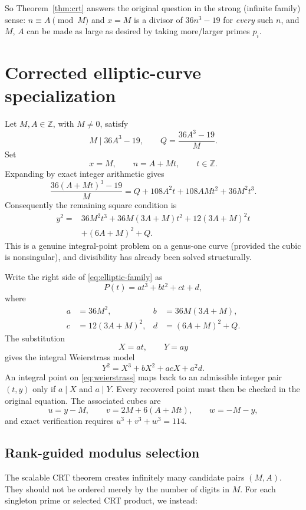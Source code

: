 \documentclass[11pt]{article}
\begin{document}
So Theorem~\ref{thm:crt} answers the original question in the strong (infinite
family) sense: $n\equiv A\pmod M$ and $x = M$ is a divisor of $36n^3-19$
for \emph{every} such $n$, and $M$, $A$ can be made as large as desired by
taking more/larger primes $p_i$.

\section{Corrected elliptic-curve specialization}\label{sec:elliptic}

Let \(M,A\in\mathbb Z\), with \(M\ne0\), satisfy
\[
  M\mid36A^3-19,
  \qquad
  Q=\frac{36A^3-19}{M}.
\]
Set
\[
  x=M,\qquad n=A+Mt,\qquad t\in\mathbb Z.
\]
Expanding by exact integer arithmetic gives
\[
 \frac{36(A+Mt)^3-19}{M}
 =Q+108A^2t+108AMt^2+36M^2t^3.
\]
Consequently the remaining square condition is
\begin{equation}\label{eq:elliptic-family}
\boxed{
\begin{aligned}
 y^2={}&36M^2t^3+36M(3A+M)t^2+12(3A+M)^2t\\
      &+(6A+M)^2+Q.
\end{aligned}}
\end{equation}
This is a genuine integral-point problem on a genus-one curve (provided the
cubic is nonsingular), and divisibility has already been solved structurally.

Write the right side of \eqref{eq:elliptic-family} as
\[
  P(t)=at^3+bt^2+ct+d,
\]
where
\[
\begin{aligned}
a&=36M^2,&
b&=36M(3A+M),\\
c&=12(3A+M)^2,&
d&=(6A+M)^2+Q.
\end{aligned}
\]
The substitution
\[
  X=at,\qquad Y=ay
\]
gives the integral Weierstrass model
\begin{equation}\label{eq:weierstrass}
  Y^2=X^3+bX^2+acX+a^2d.
\end{equation}
An integral point on \eqref{eq:weierstrass} maps back to an admissible
integer pair \((t,y)\) only if \(a\mid X\) and \(a\mid Y\).  Every recovered
point must then be checked in the original equation.  The associated cubes
are
\[
  u=y-M,\qquad v=2M+6(A+Mt),\qquad w=-M-y,
\]
and exact verification requires \(u^3+v^3+w^3=114\).

\subsection{Rank-guided modulus selection}

The scalable CRT theorem creates infinitely many candidate pairs \((M,A)\).
They should not be ordered merely by the number of digits in \(M\).  For each
singleton prime or selected CRT product, we instead:
\end{document}
